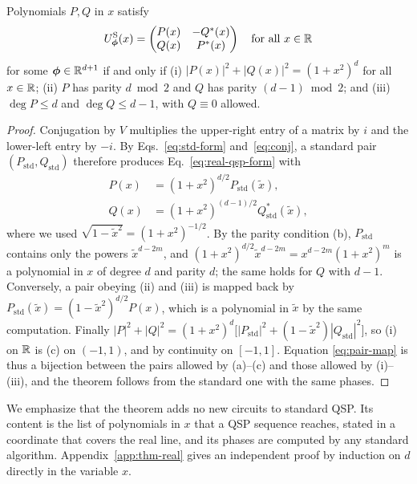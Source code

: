 \begin{theorem}
	\label{thm:real-qsp}
	Polynomials $P,Q$ in $x$ satisfy
	\begin{equation}
		U^{\mathrm{S}}_{\bm\phi}(x)=
		\begin{pmatrix} P(x) & -Q^*(x)\\ Q(x) & P^*(x)\end{pmatrix}
		\quad\text{for all }x\in\mathbb{R}
		\label{eq:real-qsp-form}
	\end{equation}
	for some $\bm\phi\in\mathbb{R}^{d+1}$ if and only if
	(i) $|P(x)|^2+|Q(x)|^2=(1+x^2)^d$ for all $x\in\mathbb{R}$;
	(ii) $P$ has parity $d\bmod 2$ and $Q$ has parity
	$(d-1)\bmod 2$; and (iii) $\deg P\le d$ and $\deg Q\le d-1$,
	with $Q\equiv 0$ allowed.
\end{theorem}

\begin{proof}
	Conjugation by $V$ multiplies the upper-right entry of a
	matrix by $i$ and the lower-left entry by $-i$.  By
	Eqs.~\eqref{eq:std-form} and~\eqref{eq:conj}, a standard pair
	$(P_{\mathrm{std}},Q_{\mathrm{std}})$ therefore produces
	Eq.~\eqref{eq:real-qsp-form} with
	\begin{equation}
		\begin{split}
			P(x)&=(1+x^2)^{d/2}P_{\mathrm{std}}(\tilde x),\\
			Q(x)&=(1+x^2)^{(d-1)/2}Q^*_{\mathrm{std}}(\tilde x),
		\end{split}
		\label{eq:pair-map}
	\end{equation}
	where we used $\sqrt{1-\tilde x^2}=(1+x^2)^{-1/2}$.  By the
	parity condition (b), $P_{\mathrm{std}}$ contains only the
	powers $\tilde x^{d-2m}$, and
	$(1+x^2)^{d/2}\tilde x^{d-2m}=x^{d-2m}(1+x^2)^m$ is a
	polynomial in $x$ of degree $d$ and parity $d$; the same
	holds for $Q$ with $d-1$.  Conversely, a pair obeying (ii) and
	(iii) is mapped back by
	$P_{\mathrm{std}}(\tilde x)=(1-\tilde x^2)^{d/2}P(x)$, which is
	a polynomial in $\tilde x$ by the same computation.  Finally
	$|P|^2+|Q|^2=(1+x^2)^d\bigl[|P_{\mathrm{std}}|^2+
	(1-\tilde x^2)|Q_{\mathrm{std}}|^2\bigr]$, so (i) on $\mathbb{R}$ is
	(c) on $(-1,1)$, and by continuity on $[-1,1]$.  Equation
	\eqref{eq:pair-map} is thus a bijection between the pairs
	allowed by (a)--(c) and those allowed by (i)--(iii), and the
	theorem follows from the standard one with the same phases.
\end{proof}

We emphasize that the theorem adds no new circuits to standard
QSP.  Its content is
the list of polynomials in $x$ that a QSP sequence reaches, stated
in a coordinate that covers the real line, and its phases are
computed by any standard algorithm.  Appendix~\ref{app:thm-real} gives an independent proof by
induction on $d$ directly in the variable $x$.

